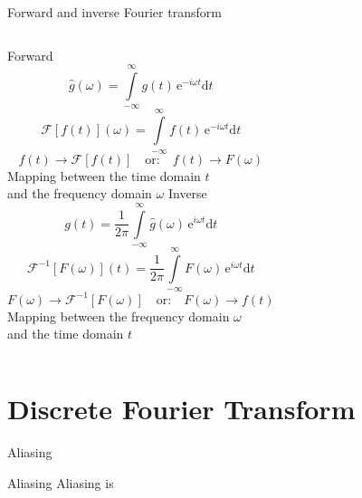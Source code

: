 \documentclass[10pt,aspectratio=169]{beamer} %
\newcommand{\ud}{\mathrm{d}}
\newcommand{\myexp}{\mathrm{e}}
\begin{document}
\begin{frame}[label=frame4]{Forward and inverse Fourier transform}
\begin{columns}[T]
	\centering
	Forward\\
	\begin{equation*}
	\hat{g}(\omega) = \int \limits_{-\infty}^{\infty} g(t)\, \myexp^{-i \omega t} \ud t 
	\end{equation*}
	\begin{equation*}
	\mathcal{F} \left[f(t) \right](\omega)=\int \limits_{-\infty}^{\infty} f(t)\, \myexp^{-i \omega t} \ud t 
	\end{equation*}
	\begin{equation*}
	f(t) \rightarrow \mathcal{F} \left[f(t) \right] \quad  \textrm{or:} \quad f(t)  \rightarrow F(\omega)
	\end{equation*}
	Mapping between the time domain \(t\) \\and the frequency domain \(\omega\)
	\centering
	Inverse\\
	\begin{equation*}
	g(t) = \frac{1}{2 \pi} \int \limits_{-\infty}^{\infty} \hat{g}(\omega)\, \myexp^{i \omega t} \ud t 
	\end{equation*}
    \begin{equation*}	
    \mathcal{F}^{-1} \left[F(\omega) \right](t)=\frac{1}{2 \pi}  \int \limits_{-\infty}^{\infty} F(\omega)\, \myexp^{i \omega t} \ud t 
	\end{equation*}
	\begin{equation*}
	F(\omega) \rightarrow \mathcal{F}^{-1} \left[F(\omega) \right] \quad   \textrm{or:} \quad 	F(\omega) \rightarrow f(t)
	\end{equation*}
	Mapping between the frequency domain  \(\omega\) \\and the time domain \(t\)
	
\end{columns}
\end{frame}
\section{Discrete Fourier Transform}
\begin{frame}{Aliasing}
\begin{alertblock}{Aliasing}
	Aliasing is
\end{alertblock}
\end{frame}
\end{document}
